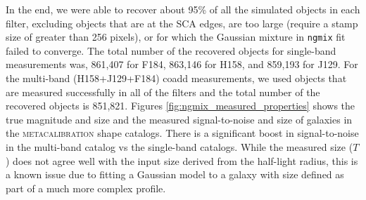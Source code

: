 \documentclass[fleqn,usenatbib]{mnras}
\begin{document}
In the end, we were able to recover about 95\% of all the simulated objects in each filter, excluding objects that are at the SCA edges, are too large (require a stamp size of greater than 256 pixels), or for which the Gaussian mixture in \texttt{ngmix} fit failed to converge. The total number of the recovered objects for single-band measurements was, 861,407 for F184, 863,146 for H158, and 859,193 for J129. For the multi-band (H158+J129+F184) coadd measurements, we used objects that are measured successfully in all of the filters and the total number of the recovered objects is 851,821.
Figures \ref{fig:ngmix_measured_properties} shows the true magnitude and size and the measured signal-to-noise and size of galaxies in the \textsc{metacalibration} shape catalogs. There is a significant boost in signal-to-noise in the multi-band catalog vs the single-band catalogs. While the measured size ($T$) does not agree well with the input size derived from the half-light radius, this is a known issue due to fitting a Gaussian model to a galaxy with size defined as part of a much more complex profile.

\end{document}
